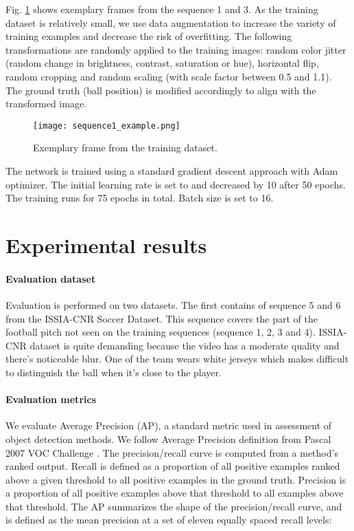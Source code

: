 \documentclass[a4paper,twoside]{article}
\begin{document}
Fig. \ref{jk:fig:training_sequences} shows exemplary frames from the sequence 1 and 3. As the training dataset is relatively small, we use data augmentation to increase the variety of training examples and decrease the risk of overfitting. The following transformations are randomly applied to the training images: random color jitter (random change in brightness, contrast, saturation or hue), horizontal flip, random cropping and random scaling (with scale factor between 0.5 and 1.1). The ground truth (ball position) is modified accordingly to align with the transformed image.

\begin{figure}
  \centering
  \texttt{[image: sequence1\_example.png]}
\caption{Exemplary frame from the training dataset.}
  \label{jk:fig:training_sequences}
\end{figure}

The network is trained using a standard gradient descent approach with Adam~\cite{King14} optimizer. The initial learning rate is set to  and decreased by 10 after 50 epochs. The training runs for 75 epochs in total. Batch size is set to 16.

\section{Experimental results}
\label{jk:section-experimental-results}

\paragraph{Evaluation dataset}
Evaluation is performed on two datasets. The first contains of sequence 5 and 6 from the ISSIA-CNR Soccer Dataset. This sequence covers the part of the football pitch not seen on the training sequences (sequence 1, 2, 3 and 4). ISSIA-CNR dataset is quite demanding because the video has a moderate quality and there's noticeable blur. One of the team wears white jerseys which makes difficult to  distinguish the ball when it's close to the player.







\paragraph{Evaluation metrics}
\label{sec:metrics}
We evaluate Average Precision (AP), a standard metric used in assessment of object detection methods. We follow Average Precision definition from Pascal 2007 VOC Challenge \cite{Ever10}.
The precision/recall curve is computed from a method’s ranked output. Recall is defined as a proportion of all positive examples ranked above a given threshold to all positive examples in the ground truth. Precision is a proportion of all positive examples above that threshold to all examples above that threshold. The AP summarizes the shape of the precision/recall curve, and is defined as the mean precision at a set of eleven equally spaced recall levels:
\end{document}
